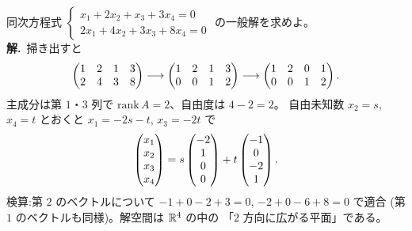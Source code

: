 \begin{rei}\label{rei:sol-free2}
同次方程式
$\begin{cases}
x_1 + 2x_2 + x_3 + 3x_4 = 0 \\
2x_1 + 4x_2 + 3x_3 + 8x_4 = 0
\end{cases}$
の一般解を求めよ。\\
\textbf{解.}\ 掃き出すと
\[
\begin{pmatrix}1 & 2 & 1 & 3 \\ 2 & 4 & 3 & 8\end{pmatrix}
\longrightarrow
\begin{pmatrix}1 & 2 & 1 & 3 \\ 0 & 0 & 1 & 2\end{pmatrix}
\longrightarrow
\begin{pmatrix}1 & 2 & 0 & 1 \\ 0 & 0 & 1 & 2\end{pmatrix}.
\]
主成分は第 $1$・$3$ 列で $\mathrm{rank}\,A = 2$、自由度は $4 - 2 = 2$。
自由未知数 $x_2 = s$, $x_4 = t$ とおくと
$x_1 = -2s - t$, $x_3 = -2t$ で
\[
\begin{pmatrix}x_1 \\ x_2 \\ x_3 \\ x_4\end{pmatrix}
= s\begin{pmatrix}-2 \\ 1 \\ 0 \\ 0\end{pmatrix} + t\begin{pmatrix}-1 \\ 0 \\ -2 \\ 1\end{pmatrix}.
\]
検算:第 $2$ のベクトルについて
$-1 + 0 - 2 + 3 = 0$, $-2 + 0 - 6 + 8 = 0$ で適合
(第 $1$ のベクトルも同様)。解空間は $\mathbb{R}^4$ の中の
「$2$ 方向に広がる平面」である。
\end{rei}

